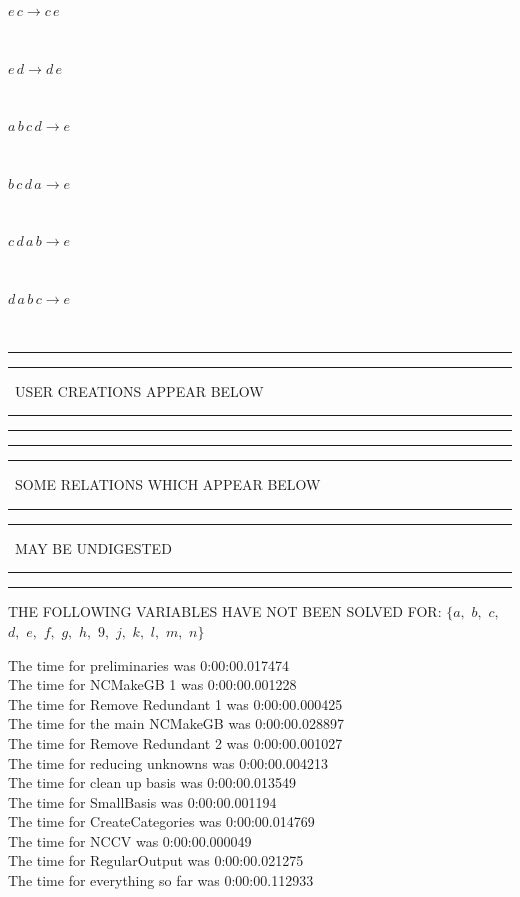 \documentclass[rep10,leqno]{report}
\begin{document}
\begin{minipage}{6in}
$
e\,
 c\rightarrow c\,
 e
$
\end{minipage}\medskip \\
\begin{minipage}{6in}
$
e\,
 d\rightarrow d\,
 e
$
\end{minipage}\medskip \\
\begin{minipage}{6in}
$
a\,
 b\,
 c\,
 d\rightarrow e
$
\end{minipage}\medskip \\
\begin{minipage}{6in}
$
b\,
 c\,
 d\,
 a\rightarrow e
$
\end{minipage}\medskip \\
\begin{minipage}{6in}
$
c\,
 d\,
 a\,
 b\rightarrow e
$
\end{minipage}\medskip \\
\begin{minipage}{6in}
$
d\,
 a\,
 b\,
 c\rightarrow e
$
\end{minipage}\\
\rule[2pt]{6in}{1pt}\hfil\break
\rule[2.5pt]{1.701in}{1pt}
\ USER CREATIONS APPEAR BELOW\ 
\rule[2.5pt]{1.701in}{1pt}\hfil\break
\rule[2pt]{6in}{1pt}\hfil\break
\rule[2pt]{6in}{4pt}\hfil\break
\rule[2pt]{1.45in}{4pt}
\ SOME RELATIONS WHICH APPEAR BELOW\ 
\rule[2pt]{1.45in}{4pt}\hfil\break
\rule[2pt]{2.18in}{4pt}
\ MAY BE UNDIGESTED\ 
\rule[2pt]{2.18in}{4pt}\hfil\break
\rule[2pt]{6in}{4pt}\hfil\break
THE FOLLOWING VARIABLES HAVE NOT BEEN SOLVED FOR:\hfil\break
$\{a,
$ $
b,
$ $
c,
$ $
d,
$ $
e,
$ $
f,
$ $
g,
$ $
h,
$ $
9,
$ $
j,
$ $
k,
$ $
l,
$ $
m,
$ $
n\}$
\smallskip\\
\vspace{10pt}

\noindent
The time for preliminaries was 0:00:00.017474\\
The time for NCMakeGB 1 was 0:00:00.001228\\
The time for Remove Redundant 1 was 0:00:00.000425\\
The time for the main NCMakeGB was 0:00:00.028897\\
The time for Remove Redundant 2 was 0:00:00.001027\\
The time for reducing unknowns was 0:00:00.004213\\
The time for clean up basis was 0:00:00.013549\\
The time for SmallBasis was 0:00:00.001194\\
The time for CreateCategories was 0:00:00.014769\\
The time for NCCV was 0:00:00.000049\\
The time for RegularOutput was 0:00:00.021275\\
The time for everything so far was 0:00:00.112933\\
\end{document}
